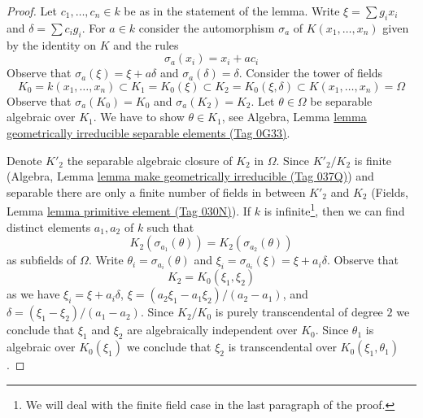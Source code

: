 \documentclass{amsart}
\theoremstyle{plain}
\theoremstyle{definition}
\theoremstyle{remark}
\numberwithin{equation}{subsection}
\begin{document}
\begin{proof}
Let $c_1, \ldots, c_n \in k$ be as in the statement of the lemma.
Write $\xi = \sum g_ix_i$ and $\delta = \sum c_ig_i$.
For $a \in k$ consider the automorphism $\sigma_a$
of $K(x_1, \ldots, x_n)$ given by the identity on $K$ and the rules
$$
\sigma_a(x_i) = x_i + a c_i
$$
Observe that $\sigma_a(\xi) = \xi + a \delta$ and $\sigma_a(\delta) = \delta$.
Consider the tower of fields
$$
K_0 = k(x_1, \ldots, x_n) \subset
K_1 = K_0(\xi) \subset
K_2 = K_0(\xi, \delta) \subset K(x_1, \ldots, x_n) = \Omega
$$
Observe that $\sigma_a(K_0) = K_0$ and $\sigma_a(K_2) = K_2$.
Let $\theta \in \Omega$ be separable algebraic over $K_1$.
We have to show $\theta \in K_1$, see Algebra, Lemma
\href{https://stacks.math.columbia.edu/tag/0G33}{lemma geometrically irreducible separable elements (Tag 0G33)}.

\medskip\noindent
Denote $K'_2$ the separable algebraic closure of $K_2$ in $\Omega$.
Since $K'_2/K_2$ is finite (Algebra, Lemma
\href{https://stacks.math.columbia.edu/tag/037Q}{lemma make geometrically irreducible (Tag 037Q)}) and
separable there are only a finite number of fields in
between $K'_2$ and $K_2$ (Fields, Lemma \href{https://stacks.math.columbia.edu/tag/030N}{lemma primitive element (Tag 030N)}).
If $k$ is infinite\footnote{We will deal with the finite field case in the
last paragraph of the proof.}, then we can find distinct elements
$a_1, a_2$ of $k$ such that
$$
K_2(\sigma_{a_1}(\theta)) = K_2(\sigma_{a_2}(\theta))
$$
as subfields of $\Omega$. Write $\theta_i = \sigma_{a_i}(\theta)$
and $\xi_i = \sigma_{a_i}(\xi) = \xi + a_i \delta$. Observe that
$$
K_2 = K_0(\xi_1, \xi_2)
$$
as we have $\xi_i = \xi + a_i \delta$,
$\xi = (a_2 \xi_1 - a_1 \xi_2)/(a_2 - a_1)$, and
$\delta = (\xi_1 - \xi_2)/(a_1 - a_2)$.
Since $K_2/K_0$ is purely transcendental of degree $2$ we conclude
that $\xi_1$ and $\xi_2$ are algebraically independent over $K_0$.
Since $\theta_1$ is algebraic over $K_0(\xi_1)$ we conclude that
$\xi_2$ is transcendental over $K_0(\xi_1, \theta_1)$.


\end{proof}
\end{document}
